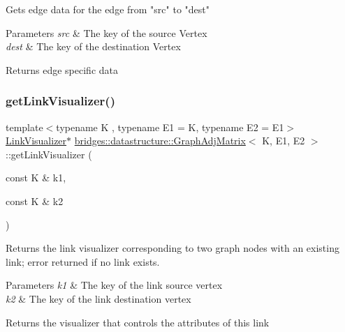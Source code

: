 \begin{DoxyVerb}Gets edge data for the edge from "src" to "dest"
\end{DoxyVerb}



\begin{DoxyParams}{Parameters}
{\em src} & The key of the source Vertex \\
\hline
{\em dest} & The key of the destination Vertex\\
\hline
\end{DoxyParams}
\begin{DoxyReturn}{Returns}
edge specific data 
\end{DoxyReturn}
\mbox{\label{classbridges_1_1datastructure_1_1_graph_adj_matrix_ab41a062af77b11e5cc034f7c21d12421}} 
\subsubsection{\texorpdfstring{getLinkVisualizer()}{getLinkVisualizer()}}
{\footnotesize\ttfamily template$<$typename K , typename E1  = K, typename E2  = E1$>$ \\
\mbox{\hyperlink{classbridges_1_1datastructure_1_1_link_visualizer}{Link\+Visualizer}}$\ast$ \mbox{\hyperlink{classbridges_1_1datastructure_1_1_graph_adj_matrix}{bridges\+::datastructure\+::\+Graph\+Adj\+Matrix}}$<$ K, E1, E2 $>$\+::get\+Link\+Visualizer (\begin{DoxyParamCaption}\item[{const K \&}]{k1,  }\item[{const K \&}]{k2 }\end{DoxyParamCaption})\hspace{0.3cm}{\ttfamily [inline]}}

Returns the link visualizer corresponding to two graph nodes with an existing link; error returned if no link exists.


\begin{DoxyParams}{Parameters}
{\em k1} & The key of the link source vertex \\
\hline
{\em k2} & The key of the link destination vertex\\
\hline
\end{DoxyParams}
\begin{DoxyReturn}{Returns}
the visualizer that controls the attributes of this link 
\end{DoxyReturn}
\mbox{\label{classbridges_1_1datastructure_1_1_graph_adj_matrix_aaf5c1ae5267b7ff4c8fcc861221ff2e8}} 
